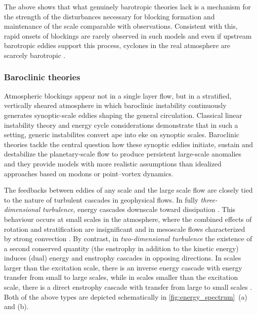 The above shows that what genuinely barotropic theories lack is
a mechanism for the strength of the disturbances necessary for blocking
formation and maintenance of the scale comparable with observations. Consistent
with this, rapid onsets of blockings are rarely observed in such models and
even if upstream barotropic eddies support this process, cyclones in the real
atmosphere are scarcely barotropic
\parencite{colucciExplosiveCyclogenesisLargescale1985,
    frederiksenOnsetBlockingCyclogenesis1984, vautardMultipleWeatherRegimes1990}.

\subsubsection{Baroclinic theories} \label{sec:intro_block_baroclinic}
Atmospheric blockings appear not in a single layer flow, but in a stratified,
vertically sheared atmosphere in which baroclinic instability continuously
generates synoptic-scale eddies shaping the general circulation. Classical
linear instability theory \parencite[e.g.,~][]{charneyDynamicsLongWaves1947,
    eadyLongWavesCyclone1949} and energy cycle considerations
\parencite{lorenzAvailablePotentialEnergy1955} demonstrate that in such a
setting, generic instabilites convert \gls{ape} into \gls{eke}
on synoptic scales. Baroclinic theories tackle the central
question how these synoptic eddies initiate, sustain and destabilize
the planetary-scale flow to
produce persistent large-scale anomalies \parencite{shuttsCaseStudyEddy1986}
and they provide models with more
realistic assumptions than idealized approaches based on modons or
point--vortex dynamics.

The feedbacks between eddies of any scale and the large scale flow are closely
tied to the nature of turbulent cascades in geophysical flows. In fully
\emph{three-dimensional turbulence}, energy cascades downscale toward
dissipation
\parencite{popeTurbulentFlows2000}. This behaviour occurs at small scales in the
atmosphere, where the combined effects of rotation and stratification are
insignificant and in
mesoscale flows characterized by strong convection
\parencite{selzEstimationVariabilityMesoscale2019,hirtScaleInteractionsMeso2023}.
By contrast, in \emph{two-dimensional turbulence} the existence of a second
conserved
quantity (the enstrophy in addition to the kinetic energy) induces (dual)
energy and enstrophy cascades in opposing directions. In scales larger than
the excitation scale, there is an inverse energy cascade with energy transfer
from small to large scales, while in scales smaller than the excitation scale,
there is a direct enstrophy cascade with transfer from large to
small scales \parencite{kraichnanInertialRangesTwodimensional1967,
    boffettaTwoDimensionalTurbulence2012}. Both of the above types are depicted
schematically in \cref{fig:energy_spectrum}~(a) and (b).

